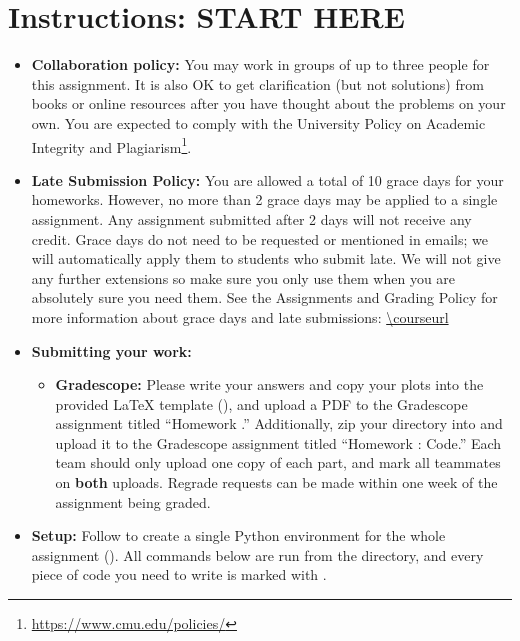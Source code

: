 \documentclass[11pt]{article}
\begin{document}
\hwheader

\section*{Instructions: START HERE}
\begin{itemize}
  \item \textbf{Collaboration policy:} You may work in groups of up to three people for this assignment. It is also OK to get clarification (but not solutions) from books or online resources after you have thought about the problems on your own. You are expected to comply with the University Policy on Academic Integrity and Plagiarism\footnote{\url{https://www.cmu.edu/policies/}}.

  \item \textbf{Late Submission Policy:} You are allowed a total of 10 grace days for your homeworks. However, no more than 2 grace days may be applied to a single assignment. Any assignment submitted after 2 days will not receive any credit. Grace days do not need to be requested or mentioned in emails; we will automatically apply them to students who submit late. We will not give any further extensions so make sure you only use them when you are absolutely sure you need them. See the Assignments and Grading Policy for more information about grace days and late submissions: \url{\courseurl}

  \item \textbf{Submitting your work:}
  \begin{itemize}
    \item \textbf{Gradescope:} Please write your answers and copy your plots into the provided \LaTeX{} template (), and upload a PDF to the Gradescope assignment titled ``Homework \hwnum.'' Additionally, zip your  directory into  and upload it to the Gradescope assignment titled ``Homework \hwnum: Code.'' Each team should only upload one copy of each part, and mark all teammates on \textbf{both} uploads. Regrade requests can be made within one week of the assignment being graded.
  \end{itemize}

  \item \textbf{Setup:} Follow  to create a single Python environment for the whole assignment (). All commands below are run from the  directory, and every piece of code you need to write is marked with .
\end{itemize}
\end{document}
